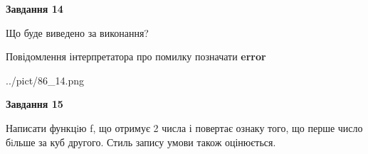 \documentclass[11pt, ukrainian]{article}
\begin{document}
{\begin {large}
{\begin {center}\textbf{Завдання 14}\end {center}}\par
Що буде виведено за виконання? \par
Повідомлення інтерпретатора про помилку позначати \textbf{error}

\begin{center}
	{../pict/86_14.png}
\end{center}
\newpage

{\begin {center}\textbf{Завдання 15}\end {center}}\par

Написати функцiю f, що отримує 2 числа і повертає ознаку того, що перше число бiльше за куб другого. Стиль запису умови також оцінюється.\par
\newpage

\end {large}}
\end{document}
